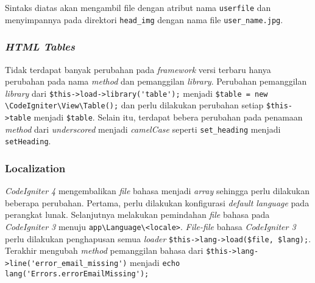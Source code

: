 Sintaks diatas akan mengambil file dengan atribut nama \texttt{userfile} dan menyimpannya pada direktori \texttt{head\_img} dengan nama file \texttt{user\_name.jpg}.

\subsubsection{\textit{HTML Tables}}

Tidak terdapat banyak perubahan pada \textit{framework} versi terbaru hanya perubahan pada nama \textit{method} dan pemanggilan \textit{library}. Perubahan pemanggilan \textit{library} dari \verb|$this->load->library('table');| menjadi \verb|$table = new \CodeIgniter\View\Table();| dan perlu dilakukan perubahan setiap \verb|$this->table| menjadi \verb|$table|. Selain itu, terdapat bebera perubahan pada penamaan \textit{method} dari \textit{underscored} menjadi \textit{camelCase} seperti \texttt{set\_heading} menjadi \texttt{setHeading}.


\subsubsection{Localization}

\textit{CodeIgniter 4} mengembalikan \textit{file} bahasa menjadi \textit{array} sehingga perlu dilakukan beberapa perubahan. Pertama, perlu dilakukan konfigurasi \textit{default language} 
pada perangkat lunak. Selanjutnya melakukan pemindahan \textit{file} bahasa pada \textit{CodeIgniter 3} menuju \verb|app\Language\<locale>|. \textit{File-file} bahasa \textit{CodeIgniter 3} perlu dilakukan penghapusan semua \textit{loader} \verb|$this->lang->load($file, $lang);|. Terakhir mengubah \textit{method} pemanggilan bahasa dari \verb|$this->lang->line('error_email_missing')| menjadi \verb|echo lang('Errors.errorEmailMissing');|
 


